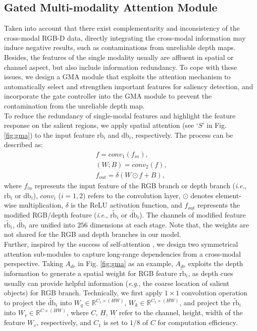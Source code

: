 \documentclass[journal]{IEEEtran}
\newcommand{\ie}{\textit{i}.\textit{e}.}
\newcommand{\eg}{\textit{e}.\textit{g}.}
\begin{document}
\subsection{Gated Multi-modality Attention Module}
Taken into account that there exist complementarity and inconsistency of the cross-modal RGB-D data, directly integrating the cross-modal information may induce negative results, such as contaminations from unreliable depth maps. Besides, the features of the single modality usually are affluent in spatial or channel aspect, but also include information redundancy.
To cope with these issues, we design a GMA module that exploits the attention mechanism to automatically select and strengthen important features for saliency detection, and incorporate the gate controller into the GMA module to prevent the contamination from the unreliable depth map. \\
\indent To reduce the redundancy of single-modal features and highlight the feature response on the salient regions, we apply spatial attention (see `$S$' in Fig. \ref{fig:gma}) to the input feature $\mathrm{rb}_i$ and $\mathrm{db}_i$, respectively. The process can be described as:
\begin{align}
&f = conv_1 (f_{in}), \\
&(W;B) = conv_2 (f), \\
&f_{out} = \delta(W \odot f + B),
\end{align}
where $f_{in}$ represents the input feature of the RGB branch or depth branch (\ie, $\mathrm{rb}_i$ or $\mathrm{db}_i$), $conv_i$ ($i=1,2$) refers to the convolution layer, $\odot$ denotes element-wise multiplication, $\delta$ is the ReLU activation function, and $f_{out}$ represents the modified RGB/depth feature (\ie, $\tilde{\mathrm{rb}_i}$ or $\tilde{\mathrm{db}_i}$).
The channels of modified feature $\tilde{\mathrm{rb}_i}$, $\tilde{\mathrm{db}_i}$ are unified into $256$ dimensions at each stage. Note that, the weights are not shared for the RGB and depth branches in our model.\\
\indent Further, inspired by the success of self-attention \cite{vaswani2017attention,wang2018non}, we design two symmetrical attention sub-modules to capture long-range dependencies from a cross-modal perspective. Taking $A_{dr}$ in Fig. \ref{fig:gma} as an example,
$A_{dr}$ exploits the depth information to generate a spatial weight for RGB feature $\tilde{\mathrm{rb}}_i$, as depth cues usually can provide helpful information (\eg, the coarse location of salient objects) for RGB branch.
Technically, we first apply $1\times 1$ convolution operation to project the $\tilde{\mathrm{db}}_i$ into $W_q \in \mathbb{R}^{C_1\times (HW)}$, $W_k \in \mathbb{R}^{C_1\times (HW)}$, and project the $\tilde{\mathrm{rb}}_i$ into $W_v \in \mathbb{R}^{C\times (HW)}$, where $C$, $H$, $W$ refer to the channel, height, width of the feature $W_v$, respectively, and $C_1$ is set to $1/8$ of $C$ for computation efficiency.
\end{document}
